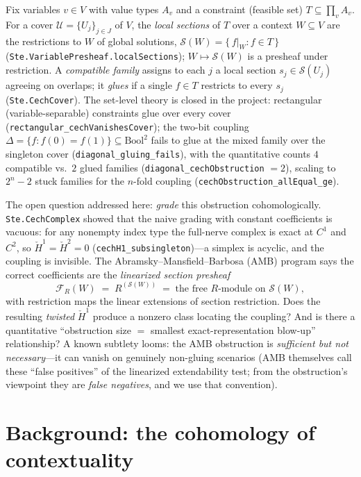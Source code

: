 \documentclass[11pt]{article}
\newcommand{\lean}[1]{\texttt{#1}}
\newcommand{\Hc}[1]{\check{H}^{#1}}
\newcommand{\FR}{\mathcal{F}_R}
\newcommand{\Sec}{\mathcal{S}}
\begin{document}
Fix variables $v \in V$ with value types $A_v$ and a constraint
(feasible set) $T \subseteq \prod_v A_v$.  For a cover
$\mathcal{U} = \{U_j\}_{j \in J}$ of $V$, the \emph{local sections} of
$T$ over a context $W \subseteq V$ are the restrictions to $W$ of
global solutions,
$\Sec(W) = \{\, f|_W : f \in T \,\}$
(\lean{Ste.VariablePresheaf.localSections}); $W \mapsto \Sec(W)$ is a
presheaf under restriction.  A \emph{compatible family} assigns to each
$j$ a local section $s_j \in \Sec(U_j)$ agreeing on overlaps; it
\emph{glues} if a single $f \in T$ restricts to every $s_j$
(\lean{Ste.CechCover}).  The set-level theory is closed in the project:
rectangular (variable-separable) constraints glue over every cover
(\lean{rectangular\_cechVanishesCover}); the two-bit coupling
$\Delta = \{f : f(0) = f(1)\} \subseteq \mathrm{Bool}^2$ fails to glue
at the mixed family over the singleton cover
(\lean{diagonal\_gluing\_fails}), with the quantitative counts
$4$ compatible vs.\ $2$ glued families
(\lean{diagonal\_cechObstruction} $= 2$), scaling to $2^n - 2$ stuck
families for the $n$-fold coupling
(\lean{cechObstruction\_allEqual\_ge}).

The open question addressed here: \emph{grade} this obstruction
cohomologically.  \lean{Ste.CechComplex} showed that the naive grading
with constant coefficients is vacuous: for any nonempty index type the
full-nerve complex is exact at $C^1$ and $C^2$, so $\Hc{1} = \Hc{2} =
0$ (\lean{cechH1\_subsingleton})---a simplex is acyclic, and the
coupling is invisible.  The Abramsky--Mansfield--Barbosa (AMB) program
\citep{abramsky2012cohomology} says the correct coefficients are the
\emph{linearized section presheaf}
\[
\FR(W) \;=\; R^{(\Sec(W))} \;=\; \text{the free $R$-module on }
\Sec(W),
\]
with restriction maps the linear extensions of section restriction.
Does the resulting \emph{twisted} $\Hc{1}$ produce a nonzero class
locating the coupling?  And is there a quantitative ``obstruction size
$=$ smallest exact-representation blow-up'' relationship?  A known
subtlety looms: the AMB obstruction is \emph{sufficient but not
necessary}---it can vanish on genuinely non-gluing scenarios (AMB
themselves call these ``false positives'' of the linearized
extendability test; from the obstruction's viewpoint they are
\emph{false negatives}, and we use that convention).

\section{Background: the cohomology of contextuality}
\label{sec:background}
\end{document}
